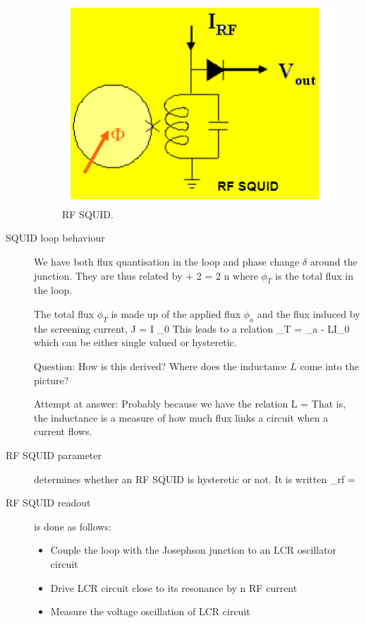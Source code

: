 \begin{description}
\begin{figure}[h]
  \caption{RF SQUID.}
  \centering
    \includegraphics[width=\textwidth]{./SC_figures/RF_SQUID.PNG}
\end{figure}

\item[SQUID loop behaviour] We have both flux quantisation in the loop and phase change $\delta $ around the junction. They are thus related by 
\beq
\delta  + 2 \pi {} = 2 n \pi
\eeq
where $\phi_T$ is the total flux in the loop. 

The total flux $\phi_T$ is made up of the applied flux $\phi_a$ and the flux induced by the screening current, 
\beq
J = I _0 \sin{\delta}
\eeq
This leads to a relation
\beq
\phi_T = \phi_a - LI_0 
\eeq
which can be either single valued or hysteretic. 

Question: How is this derived? Where does the inductance $L$ come into the picture? 

Attempt at answer: Probably because we have the relation
\beq
L = 
\eeq
That is, the inductance is a measure of how much flux links a circuit when a current flows. 

\item[RF SQUID parameter] determines whether an RF SQUID is hysteretic or not. It is written
\beq
\beta_{rf} =  
\eeq


\item[RF SQUID readout] is done as follows:
\begin{itemize}
\item Couple the loop with the Josephson junction to an LCR oscillator circuit 
\item Drive LCR circuit close to its resonance by n RF current
\item Measure the voltage oscillation of LCR circuit 
\end{itemize}


\end{description}
